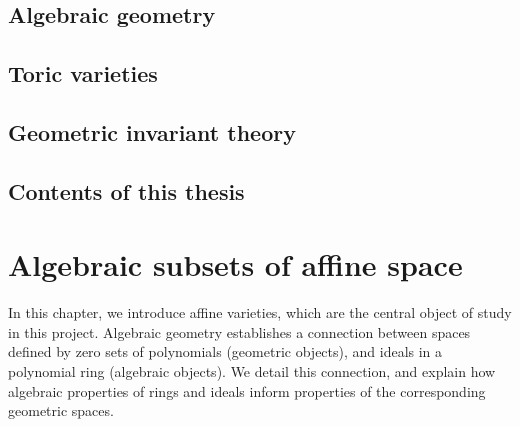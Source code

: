 \documentclass[12pt]{amsart}
\theoremstyle{plain}
\begin{document}
\subsection{Algebraic geometry}



\subsection{Toric varieties}



\subsection{Geometric invariant theory}



\subsection{Contents of this thesis}



\newpage
\section{Algebraic subsets of affine space}\label{chapter:algebraicsets}
In this chapter, we introduce affine varieties, which are the central object of study in this project.
Algebraic geometry establishes a connection between spaces defined by zero sets of polynomials (geometric objects), and ideals in a polynomial ring (algebraic objects).
We detail this connection, and explain how algebraic properties of rings and ideals inform properties of the corresponding geometric spaces.
\end{document}
